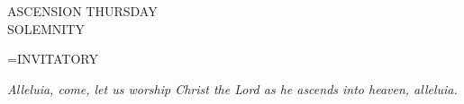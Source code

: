 \begin{center}\normalsize ASCENSION THURSDAY\\
\footnotesize SOLEMNITY\\
\end{center}

\hangindent=\parindent \small{INVITATORY}
\begin{center}
\textit{Alleluia, come, let us worship Christ the Lord as he ascends into heaven, alleluia.\\}
\end{center}

